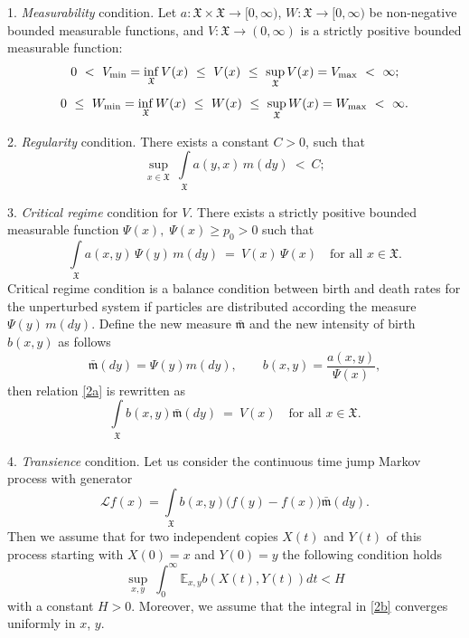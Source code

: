 \documentclass[a4paper,12pt]{article}
\newcommand{\XXX}{{\mathfrak{X}}}
\begin{document}
1. {\it Measurability } condition. Let   $a:\XXX \times \XXX \to [0, \infty)$, $W:  \XXX \to [0, \infty)$ be non-negative bounded measurable functions, and $V: \XXX \to (0, \infty)$ is a strictly positive bounded measurable function:
  \begin{equation}\label{V}
  0 \ < \  V_{{\rm min}} = \inf\limits_{\XXX} V(x) \ \le \ V(x) \ \le  \ \sup\limits_{\XXX} V(x) = V_{{\rm max}} \ < \ \infty;
\end{equation}
 \begin{equation}\label{W}
   0 \ \le \  W_{{\rm min}} = \inf\limits_{\XXX} W(x) \ \le \ W(x) \ \le  \ \sup\limits_{\XXX} W(x) = W_{{\rm max}} \ < \ \infty.
\end{equation}

2. {\it Regularity} condition. There exists a constant $C>0$, such that
\begin{equation}\label{2a-bis}
\sup\limits_{x \in \XXX} \ \int\limits_{\XXX} a(y,x) \, %
m( dy) \ < \ C;
\end{equation}

3. {\it Critical regime} condition for $V$. There exists a strictly positive bounded measurable function $\Psi(x), \; \Psi(x) \ge p_0>0$ such that
\begin{equation}\label{2a}
 \int\limits_{\XXX} a(x,y)\, \Psi(y) \, m(dy) \ = \ V(x) \, \Psi(x) \quad \mbox{for all } x \in \XXX.
\end{equation}
Critical regime condition is a balance condition between birth and death rates for the unperturbed system if particles are distributed according the measure $\Psi(y) \, m(dy)$.
Define the new measure $\bar{\mathfrak{m}}$ and the new intensity of birth $ b(x,y)$ as follows
\begin{equation}\label{nb}
\bar{\mathfrak{m}}(dy)  = \Psi(y) m(dy), \qquad b(x,y) = \frac{a(x,y)}{\Psi(x)},
\end{equation}
then relation  \eqref{2a} is rewritten as
\begin{equation}\label{cr}
 \int\limits_{\XXX} b(x,y)  \bar{\mathfrak{m}}(dy) \ = \ V(x) \quad \mbox{for all } x \in \XXX.
\end{equation}

4. {\it Transience} condition.
Let us consider the continuous time jump Markov process with generator
\begin{equation}\label{LL}
\mathcal{L} f(x) =  \int\limits_{\XXX} b(x,y) \big( f(y) - f(x) \big)  \bar{\mathfrak{m}}(dy).
\end{equation}
Then we assume that for two independent copies $X(t)$ and $Y(t)$ of this process starting with $X(0)=x$ and $Y(0)=y$ the following condition holds
\begin{equation}\label{2b}
\sup\limits_{x,y} \ \int_{0}^{\infty} \mathbb{E}_{x,y} b(X(t), Y(t)) dt < H
\end{equation}
with a constant $H>0$. Moreover, we assume that the integral in \eqref{2b} converges uniformly in $x$, $y$.
\end{document}
